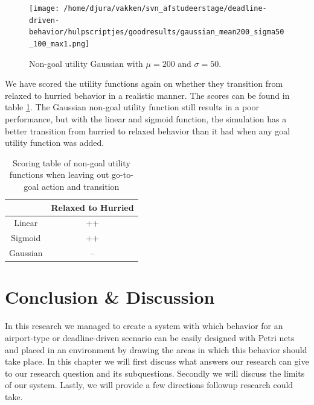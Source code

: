\documentclass[11pt, a4paper]{book}
\begin{document}
\begin{figure}
\centering
\texttt{[image: /home/djura/vakken/svn\_afstudeerstage/deadline-driven-behavior/hulpscriptjes/goodresults/gaussian\_mean200\_sigma50\_100\_max1.png]}
\caption{Non-goal utility Gaussian with $\mu=200$ and $\sigma=50$.}
\label{fig:Gaussian_mean200_sigma50_100_max1}
\end{figure}

We have scored the utility functions again on whether they transition from relaxed to hurried behavior in a realistic manner. The scores can be found in table \ref{tab:secondquantitativetable}. The Gaussian non-goal utility function still results in a poor performance, but with the linear and sigmoid function, the simulation has a better transition from hurried to relaxed behavior than it had when any goal utility function was added.

\begin{table}
\centering
\begin{tabular}{|c|c|}
\hline 
 & Relaxed to Hurried\\ 
\hline 
Linear & ++  \\ 
\hline 
Sigmoid & ++  \\ 
\hline 
Gaussian & --\\
\hline
\end{tabular} 
\caption{Scoring table of non-goal utility functions when leaving out go-to-goal action and transition}
\label{tab:secondquantitativetable}
\end{table}

\chapter{Conclusion \& Discussion}
\label{chap:conclusiondiscusssion}
In this research we managed to create a system with which behavior for an airport-type or deadline-driven scenario can be easily designed with Petri nets and placed in an environment by drawing the areas in which this behavior should take place. In this chapter we will first discuss what answers our research can give to our research question and its subquestions. Secondly we will discuss the limits of our system. Lastly, we will provide a few directions followup research could take.
\end{document}
